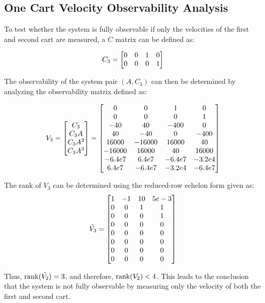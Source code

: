 \documentclass[]{article}
\begin{document}
		\subsection{One Cart Velocity Observability Analysis}
			To test whether the system is fully observable if only the velocities of the first and second cart are measured, a $C$ matrix can be defined as:
			
			\begin{equation}
				C_3 = \mqty[0	&0	&1	&0\\
							0	&0	&0	&1]
			\end{equation}
			
			The observability of the system pair $(A, C_3)$ can then be determined by analyzing the observability matrix defined as:
			
			\begin{equation}
				V_3 = \mqty[C_3\\ C_3A\\ C_3A^2\\ C_3A^3]
					= \mqty[0		&0		&1		&0\\
							0		&0		&0		&1\\
							-40		&40		&-400	&0\\
							40		&-40		&0		&-400\\
							16000	&-16000	&16000	&40\\
							-16000	&16000	&40		&16000\\
							-6.4e7	&6.4e7	&-6.4e7	&-3.2e4\\
							6.4e7	&-6.4e7	&-3.2e4	&-6.4e7]
			\end{equation}
			
			The rank of $V_3$ can be determined using the reduced-row echelon form given as:
			\begin{equation}
				\tilde{V_3} = \mqty[1	&-1	&10	&5e-3\\
									0	&0	&1	&1\\
									0	&0	&0	&1\\
									0	&0	&0	&0\\
									0	&0	&0	&0\\
									0	&0	&0	&0\\
									0	&0	&0	&0\\
									0	&0	&0	&0]
			\end{equation}
			
			Thus, $\rank(\tilde{V_2}) = 3$, and therefore, $\rank(V_2) < 4$. This leads to the conclusion that the system is not fully observable by measuring only the velocity of both the first and second cart.
	
\end{document}
